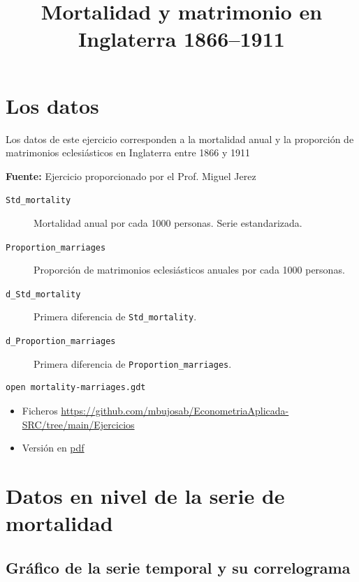 \documentclass[10pt]{article}
\date{}
\title{Mortalidad y matrimonio en Inglaterra 1866--1911}
\begin{document}
\maketitle
\section*{Los datos}
\label{sec:org086b5be}

Los datos de este ejercicio corresponden a la mortalidad anual y la
proporción de matrimonios eclesiásticos en Inglaterra entre 1866 y
1911 

\textbf{Fuente:} Ejercicio proporcionado por el Prof. Miguel Jerez

\begin{description}
\item[{\texttt{Std\_mortality}}] Mortalidad anual por cada 1000 personas. Serie estandarizada.
\item[{\texttt{Proportion\_marriages}}] Proporción de matrimonios eclesiásticos
anuales por cada 1000 personas.
\item[{\texttt{d\_Std\_mortality}}] Primera diferencia de \texttt{Std\_mortality}.
\item[{\texttt{d\_Proportion\_marriages}}] Primera diferencia de
\texttt{Proportion\_marriages}.
\end{description}

\begin{verbatim}
open mortality-marriages.gdt
\end{verbatim}

\begin{itemize}
\item Ficheros \url{https://github.com/mbujosab/EconometriaAplicada-SRC/tree/main/Ejercicios}
\item Versión en \href{https://github.com/mbujosab/EconometriaAplicada-SRC/blob/main/Ejercicios/mortality-marriages.pdf}{pdf}
\end{itemize}
\section*{Datos en nivel de la serie de mortalidad}
\label{sec:org24130e1}

\subsection*{Gráfico de la serie temporal y su correlograma}
\label{sec:org6380ca8}
\end{document}
